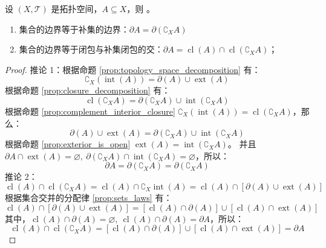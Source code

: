 \begin{corollary}
    设 $(X,\mathcal{T})$ 是拓扑空间，$A\subseteq X$，则 。
    \begin{enumerate}
        \item 集合的边界等于补集的边界：$\partial A = \partial (\complement_X A)$
        \item 集合的边界等于闭包与补集闭包的交：$\partial A = \operatorname{cl}(A) \cap \operatorname{cl}(\complement_X A)$；
    \end{enumerate}
\end{corollary}
\begin{proof}
    推论 1：根据命题 \ref{prop:topology_space_decomposition} 有：
    \[
        \complement_X(\operatorname{int}(A)) = \partial(A) \cup \operatorname{ext}(A)
    \]
    根据命题 \ref{prop:closure_decomposition} 有：
    \[
        \operatorname{cl}(\complement_X A) = \partial(\complement_X A) \cup \operatorname{int}(\complement_X A)
    \]
    根据命题 \ref{prop:complement_interior_closure} $\complement_X(\operatorname{int}(A)) = \operatorname{cl}(\complement_X A)$，那么：
    \[
        \partial(A) \cup \operatorname{ext}(A) = \partial(\complement_X A) \cup \operatorname{int}(\complement_X A)
    \]
    根据命题 \ref{prop:exterior_is_open} $\operatorname{ext}(A) = \operatorname{int}(\complement_X A)$。
    并且 $\partial A \cap \operatorname{ext}(A) = \varnothing,\ \partial(\complement_X A) \cap \operatorname{int}(\complement_X A) = \varnothing$，所以：
    \[
        \partial A = \partial (\complement_X A) = \partial (\complement_X A)
    \]
    推论 2：
    \[
        \operatorname{cl}(A) \cap \operatorname{cl}(\complement_X A) =\operatorname{cl}(A) \cap \complement_X \operatorname{int}(A) = \operatorname{cl}(A) \cap [\partial(A) \cup \operatorname{ext}(A)]
    \]
    根据集合交并的分配律 \ref{prop:sets_laws} 有：
    \[
        \operatorname{cl}(A) \cap [\partial(A) \cup \operatorname{ext}(A)] = [\operatorname{cl}(A) \cap \partial(A)] \cup [\operatorname{cl}(A) \cap \operatorname{ext}(A)]
    \]
    其中，$\operatorname{cl}(A) \cap \partial(A) = \varnothing,\ \operatorname{cl}(A) \cap \partial(A) = \partial A$，所以：
    \[
        \operatorname{cl}(A) \cap \operatorname{cl}(\complement_X A) = [\operatorname{cl}(A) \cap \partial(A)] \cup [\operatorname{cl}(A) \cap \operatorname{ext}(A)] = \partial A
    \]
\end{proof} 

